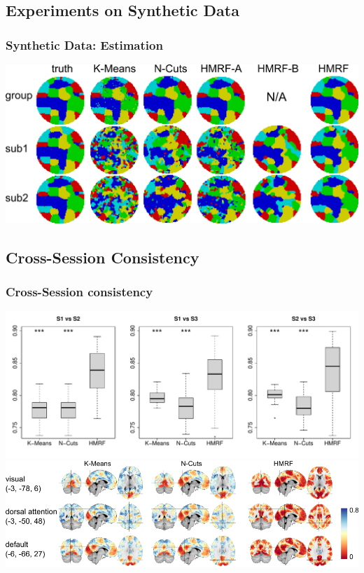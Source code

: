 \documentclass[sansserif, 10pt]{beamer}
\begin{document}
\begin{frame}
\end{frame}

\subsection{Experiments on Synthetic Data}
\begin{frame}
  \frametitle{Synthetic Data: Estimation}
  \includegraphics[width = 1\textwidth]{sfig/allmaps}
\end{frame}



\subsection{Cross-Session Consistency}
\begin{frame}
  \frametitle{Cross-Session consistency}
  \centering
   {
    \includegraphics[width = 1\textwidth]{sfig/boxplot}\\
  }
   {
    \includegraphics[width = 1\textwidth]{sfig/012variance}
  }
\end{frame}
\end{document}
